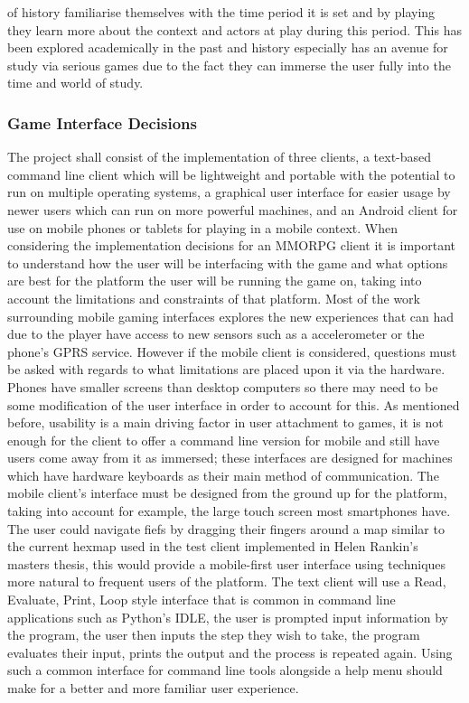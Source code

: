 \documentclass{article}
\begin{document}
of history familiarise themselves with the time period it is set and by playing they learn more about the context and actors at play during this period. This has been explored academically in the past\cite{seriousgames} and history especially has an avenue for study via serious games due to the fact they can immerse the user fully into the time and world of study.
	\subsubsection{Game Interface Decisions}
	The project shall consist of the implementation of three clients, a text-based command line client which will be lightweight and portable with the potential to run on multiple operating systems, a graphical user interface for easier usage by newer users which can run on more powerful machines, and an Android client for use on mobile phones or tablets for playing in a mobile context. When considering the implementation decisions for an MMORPG client it is important to understand how the user will be interfacing with the game and what options are best for the platform the user will be running the game on, taking into account the limitations and constraints of that platform. Most of the work surrounding mobile gaming interfaces explores the new experiences that can had due to the player have access to new sensors such as a accelerometer or the phone's GPRS service. However if the mobile client is considered, questions must be asked with regards to what limitations are placed upon it via the hardware. Phones have smaller screens than desktop computers so there may need to be some modification of the user interface in order to account for this. As mentioned before, usability is a main driving factor in user attachment to games\cite{Christou:2012:EPP:2367616.2367630}, it is not enough for the client to offer a command line version for mobile and still have users come away from it as immersed; these interfaces are designed for machines which have hardware keyboards as their main method of communication. The mobile client's interface must be designed from the ground up for the platform, taking into account for example, the large touch screen most smartphones have. The user could navigate fiefs by dragging their fingers around a map similar to the current hexmap used in the test client implemented in Helen Rankin's masters thesis\cite{helenrankin}, this would provide a mobile-first user interface using techniques more natural to frequent users of the platform. The text client will use a Read, Evaluate, Print, Loop style interface that is common in command line applications such as Python's IDLE\cite{python}, the user is prompted input information by the program, the user then inputs the step they wish to take, the program evaluates their input, prints the output and the process is repeated again. Using such a common interface for command line tools alongside a help menu should make for a better and more familiar user experience.
\end{document}
